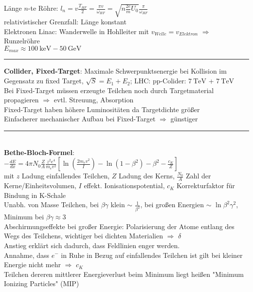 \documentclass[10pt,twoside,a4paper]{article}
\begin{document}
\begin{multicols*}{3}
Länge $n$-te Röhre: $l_n = v \frac{T_{HF}}{2} = \frac{\pi v}{\omega_{HF}} = \sqrt{n \frac{2e}{m} U_0} \frac{\pi}{\omega_{HF}}$ \\ relativistischer Grenzfall: Länge konstant \\
Elektronen Linac: Wanderwelle in Hohlleiter mit $v_{Welle} = v_{Elektron}$ $\Rightarrow$ Runzelröhre \\
$E_{max} \approx \SI{100}{\kilo\eV} - \SI{50}{\giga\eV}$
\\ \rule[0ex]{\columnwidth}{0.5pt}
\textbf{Collider, Fixed-Target}: Maximale Schwerpunktsenergie bei Kollision im Gegensatz zu fixed Target, $\sqrt{S} = E_1 + E_2$; LHC: pp-Colider: $\SI{7}{\tera\eV}$ + $\SI{7}{\tera\eV}$ \\
Bei Fixed-Target müssen erzeugte Teilchen noch durch Targetmaterial propagieren $\Rightarrow$ evtl. Streuung, Absorption \\
Fixed-Target haben höhere Luminositäten da Targetdichte größer \\
Einfacherer mechanischer Aufbau bei Fixed-Target $\Rightarrow$ günstiger
\\ \rule[0ex]{\columnwidth}{0.5pt}
\ \\
\textbf{Bethe-Bloch-Formel}: \\
{\tiny $-\frac{dE}{dx} = 4 \pi N_0 \frac{Z}{A} \frac{z^2 e^4}{m_e v^2} \left[ \ln \left( \frac{2 m_e v^2}{I} \right) - \ln \left( 1 - \beta^2 \right) - \beta^2 - \frac{c_K}{Z} \right]$} \\
mit $z$ Ladung einfallendes Teilchen, $Z$ Ladung des Kerns, $\frac{N_0}{A}$ Zahl der Kerne/Einheitsvolumen, $I$ effekt. Ionisationspotential, $c_K$ Korrekturfaktor für Bindung in K-Schale \\
Unabh. von Masse Teilchen, bei $\beta \gamma$ klein $\sim$ $\frac{1}{\beta^2}$, bei großen Energien $\sim$ $\ln \beta^2 \gamma^2$, Minimum bei $\beta \gamma \approx 3$ \\
Abschirmungseffekte bei großer Energie: Polarisierung der Atome entlang des Wegs des Teilchens, wichtiger bei dichten Materialien $\Rightarrow$ $\delta$ \\
Anstieg erklärt sich dadurch, dass Feldlinien enger werden. \\
Annahme, dass $e^-$ in Ruhe in Bezug auf einfallendes Teilchen ist gilt bei kleiner Energie nicht mehr $\Rightarrow$ $c_K$ \\
Teilchen dereren mittlerer Energieverlust beim Minimum liegt heißen "Minimum Ionizing Particles" (MIP)

\end{multicols*}
\end{document}
